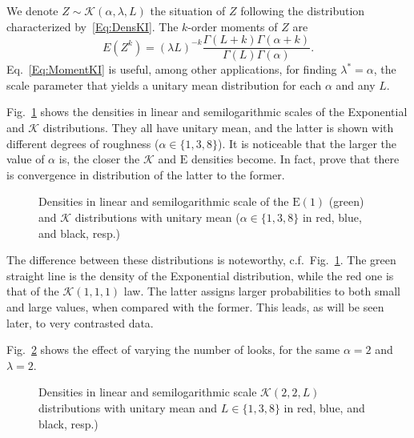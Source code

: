 We denote $Z\sim \mathcal K(\alpha,\lambda,L)$ the situation of $Z$ following the distribution characterized by~\eqref{Eq:DensKI}.
The $k$-order moments of $Z$ are
\begin{equation}
E(Z^k) = (\lambda L)^{-k} \frac{\Gamma(L+k)\Gamma(\alpha+k)}{\Gamma(L)\Gamma(\alpha)}.
\label{Eq:MomentKI}
\end{equation}
Eq.~\eqref{Eq:MomentKI} is useful, among other applications, for finding $\lambda^*=\alpha$, the scale parameter that yields a unitary mean distribution for each $\alpha$ and any $L$.

Fig.~\ref{Fig:KIDistribution} shows the densities in linear and semilogarithmic scales of the Exponential and $\mathcal K$ distributions.
They all have unitary mean, and the latter is shown with different degrees of roughness ($\alpha\in\{1,3,8\}$).
It is noticeable that the larger the value of $\alpha$ is, the closer the $\mathcal K$ and $\text{E}$ densities become.
In fact, \citet{frery96} prove that there is convergence in distribution of the latter to the former.

\begin{figure}[hbt]
\centering
{}
\caption{Densities in linear and semilogarithmic scale of the $\text{E}(1)$ (green) and $\mathcal K$ distributions with unitary mean ($\alpha\in\{1,3,8\}$ in red, blue, and black, resp.)}\label{Fig:KIDistribution}
\end{figure}

The difference between these distributions is noteworthy, c.f.\ Fig.~\ref{Fig:KIDistribution}.
The green straight line is the density of the Exponential distribution, while the red one is that of the $\mathcal K(1,1,1)$ law.
The latter assigns larger probabilities to both small and large values, when compared with the former.
This leads, as will be seen later, to very contrasted data.

Fig.~\ref{Fig:KIDistributionLooks} shows the effect of varying the number of looks, for the same $\alpha=2$ and $\lambda=2$.

\begin{figure}[hbt]
\centering
{}
\caption{Densities in linear and semilogarithmic scale $\mathcal K(2,2,L)$ distributions with unitary mean and $L\in\{1,3,8\}$ in red, blue, and black, resp.)}\label{Fig:KIDistributionLooks}
\end{figure}

